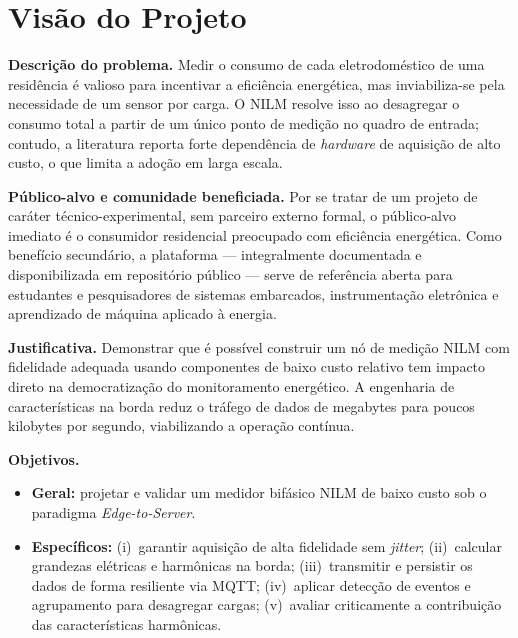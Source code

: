 \documentclass[12pt,a4paper]{article}
\begin{document}
\section{Vis\~ao do Projeto}

\textbf{Descri\c{c}\~ao do problema.} Medir o consumo de cada eletrodom\'estico de
uma resid\^encia \'e valioso para incentivar a efici\^encia energ\'etica, mas
inviabiliza-se pela necessidade de um sensor por carga. O NILM resolve isso ao
desagregar o consumo total a partir de um \'unico ponto de medi\c{c}\~ao no quadro
de entrada; contudo, a literatura reporta forte depend\^encia de \textit{hardware}
de aquisi\c{c}\~ao de alto custo, o que limita a ado\c{c}\~ao em larga escala.

\textbf{P\'ublico-alvo e comunidade beneficiada.} Por se tratar de um projeto de
car\'ater t\'ecnico-experimental, sem parceiro externo formal, o p\'ublico-alvo
imediato \'e o consumidor residencial preocupado com efici\^encia energ\'etica.
Como benef\'icio secund\'ario, a plataforma --- integralmente documentada e
disponibilizada em reposit\'orio p\'ublico --- serve de refer\^encia aberta para
estudantes e pesquisadores de sistemas embarcados, instrumenta\c{c}\~ao eletr\^onica
e aprendizado de m\'aquina aplicado \`a energia.

\textbf{Justificativa.} Demonstrar que \'e poss\'ivel construir um n\'o de
medi\c{c}\~ao NILM com fidelidade adequada usando componentes de baixo custo
relativo tem impacto direto na democratiza\c{c}\~ao do monitoramento energ\'etico.
A engenharia de caracter\'isticas na borda reduz o tr\'afego de dados de megabytes
para poucos kilobytes por segundo, viabilizando a opera\c{c}\~ao cont\'inua.

\textbf{Objetivos.}
\begin{itemize}[nosep]
  \item \textbf{Geral:} projetar e validar um medidor bif\'asico NILM de baixo
  custo sob o paradigma \textit{Edge-to-Server}.
  \item \textbf{Espec\'ificos:} (i)~garantir aquisi\c{c}\~ao de alta fidelidade sem
  \textit{jitter}; (ii)~calcular grandezas el\'etricas e harm\^onicas na borda;
  (iii)~transmitir e persistir os dados de forma resiliente via MQTT;
  (iv)~aplicar detec\c{c}\~ao de eventos e agrupamento para desagregar cargas;
  (v)~avaliar criticamente a contribui\c{c}\~ao das caracter\'isticas harm\^onicas.
\end{itemize}
\end{document}
